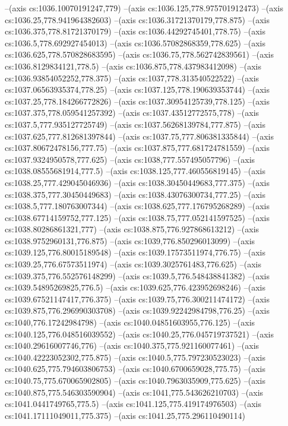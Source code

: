 --(axis cs:1036.10070191247,779)
--(axis cs:1036.125,778.975701912473)
--(axis cs:1036.25,778.941964382603)
--(axis cs:1036.31721370179,778.875)
--(axis cs:1036.375,778.81721370179)
--(axis cs:1036.44292745401,778.75)
--(axis cs:1036.5,778.692927454013)
--(axis cs:1036.57082868359,778.625)
--(axis cs:1036.625,778.570828683595)
--(axis cs:1036.75,778.562742839561)
--(axis cs:1036.8129834121,778.5)
--(axis cs:1036.875,778.437983412098)
--(axis cs:1036.93854052252,778.375)
--(axis cs:1037,778.313540522522)
--(axis cs:1037.06563935374,778.25)
--(axis cs:1037.125,778.190639353744)
--(axis cs:1037.25,778.184266772826)
--(axis cs:1037.30954125739,778.125)
--(axis cs:1037.375,778.059541257392)
--(axis cs:1037.43512772575,778)
--(axis cs:1037.5,777.935127725749)
--(axis cs:1037.56268139784,777.875)
--(axis cs:1037.625,777.812681397844)
--(axis cs:1037.75,777.806381335844)
--(axis cs:1037.80672478156,777.75)
--(axis cs:1037.875,777.681724781559)
--(axis cs:1037.9324950578,777.625)
--(axis cs:1038,777.557495057796)
--(axis cs:1038.08555681914,777.5)
--(axis cs:1038.125,777.460556819145)
--(axis cs:1038.25,777.429045046936)
--(axis cs:1038.30450449683,777.375)
--(axis cs:1038.375,777.30450449683)
--(axis cs:1038.43076300734,777.25)
--(axis cs:1038.5,777.180763007344)
--(axis cs:1038.625,777.176795268289)
--(axis cs:1038.67714159752,777.125)
--(axis cs:1038.75,777.052141597525)
--(axis cs:1038.80286861321,777)
--(axis cs:1038.875,776.927868613212)
--(axis cs:1038.9752960131,776.875)
--(axis cs:1039,776.850296013099)
--(axis cs:1039.125,776.80015189548)
--(axis cs:1039.17573511974,776.75)
--(axis cs:1039.25,776.67573511974)
--(axis cs:1039.3025761483,776.625)
--(axis cs:1039.375,776.552576148299)
--(axis cs:1039.5,776.548438841382)
--(axis cs:1039.54895269825,776.5)
--(axis cs:1039.625,776.423952698246)
--(axis cs:1039.67521147417,776.375)
--(axis cs:1039.75,776.300211474172)
--(axis cs:1039.875,776.296990303708)
--(axis cs:1039.92242984798,776.25)
--(axis cs:1040,776.17242984798)
--(axis cs:1040.04851603955,776.125)
--(axis cs:1040.125,776.048516039552)
--(axis cs:1040.25,776.045719737521)
--(axis cs:1040.29616007746,776)
--(axis cs:1040.375,775.921160077461)
--(axis cs:1040.42223052302,775.875)
--(axis cs:1040.5,775.797230523023)
--(axis cs:1040.625,775.794603806753)
--(axis cs:1040.6700659028,775.75)
--(axis cs:1040.75,775.670065902805)
--(axis cs:1040.7963035909,775.625)
--(axis cs:1040.875,775.546303590904)
--(axis cs:1041,775.543626210703)
--(axis cs:1041.0441749765,775.5)
--(axis cs:1041.125,775.419174976503)
--(axis cs:1041.17111049011,775.375)
--(axis cs:1041.25,775.296110490114)
